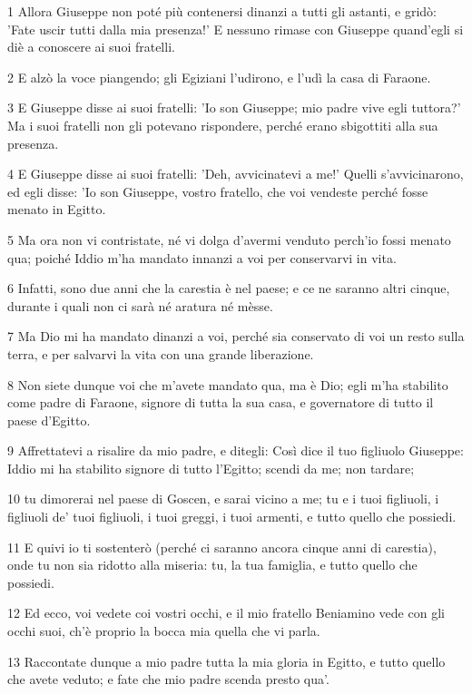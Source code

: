 \par 1 Allora Giuseppe non poté più contenersi dinanzi a tutti gli astanti, e gridò: 'Fate uscir tutti dalla mia presenza!' E nessuno rimase con Giuseppe quand'egli si diè a conoscere ai suoi fratelli.
\par 2 E alzò la voce piangendo; gli Egiziani l'udirono, e l'udì la casa di Faraone.
\par 3 E Giuseppe disse ai suoi fratelli: 'Io son Giuseppe; mio padre vive egli tuttora?' Ma i suoi fratelli non gli potevano rispondere, perché erano sbigottiti alla sua presenza.
\par 4 E Giuseppe disse ai suoi fratelli: 'Deh, avvicinatevi a me!' Quelli s'avvicinarono, ed egli disse: 'Io son Giuseppe, vostro fratello, che voi vendeste perché fosse menato in Egitto.
\par 5 Ma ora non vi contristate, né vi dolga d'avermi venduto perch'io fossi menato qua; poiché Iddio m'ha mandato innanzi a voi per conservarvi in vita.
\par 6 Infatti, sono due anni che la carestia è nel paese; e ce ne saranno altri cinque, durante i quali non ci sarà né aratura né mèsse.
\par 7 Ma Dio mi ha mandato dinanzi a voi, perché sia conservato di voi un resto sulla terra, e per salvarvi la vita con una grande liberazione.
\par 8 Non siete dunque voi che m'avete mandato qua, ma è Dio; egli m'ha stabilito come padre di Faraone, signore di tutta la sua casa, e governatore di tutto il paese d'Egitto.
\par 9 Affrettatevi a risalire da mio padre, e ditegli: Così dice il tuo figliuolo Giuseppe: Iddio mi ha stabilito signore di tutto l'Egitto; scendi da me; non tardare;
\par 10 tu dimorerai nel paese di Goscen, e sarai vicino a me; tu e i tuoi figliuoli, i figliuoli de' tuoi figliuoli, i tuoi greggi, i tuoi armenti, e tutto quello che possiedi.
\par 11 E quivi io ti sostenterò (perché ci saranno ancora cinque anni di carestia), onde tu non sia ridotto alla miseria: tu, la tua famiglia, e tutto quello che possiedi.
\par 12 Ed ecco, voi vedete coi vostri occhi, e il mio fratello Beniamino vede con gli occhi suoi, ch'è proprio la bocca mia quella che vi parla.
\par 13 Raccontate dunque a mio padre tutta la mia gloria in Egitto, e tutto quello che avete veduto; e fate che mio padre scenda presto qua'.
